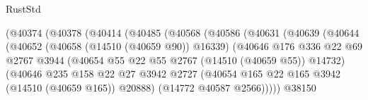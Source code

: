 \begin{lexlean}{RustStd}
\begin{coremodule}
                                    (@40374
                                      (@40378
                                        (@40414
                                          (@40485
                                            (@40568
                                              (@40586
                                                (@40631
                                                  (@40639
                                                    (@40644
                                                      (@40652
                                                        (@40658 (@14510 (@40659 @90)) @16339)
                                                        (@40646
                                                          @176
                                                          @336
                                                          @22
                                                          @69
                                                          @2767
                                                          @3944
                                                          (@40654
                                                            @55
                                                            @22
                                                            @55
                                                            @2767
                                                            (@14510 (@40659 @55))
                                                            @14732)
                                                          (@40646
                                                            @235
                                                            @158
                                                            @22
                                                            @27
                                                            @3942
                                                            @2727
                                                            (@40654
                                                              @165
                                                              @22
                                                              @165
                                                              @3942
                                                              (@14510 (@40659 @165))
                                                              @20888)
                                                            (@14772 @40587 @2566)))))
                                                    @38150

\end{coremodule}
\end{lexlean}
